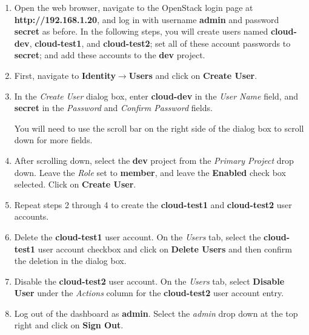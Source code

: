 \documentclass[letterpaper, 12pt]{article}
\begin{document}
\begin{enumerate}
    \item Open the web browser, navigate to the OpenStack login page at \textbf{http://192.168.1.20}, and log in with
    username \textbf{admin} and password \textbf{secret} as before. In the following steps, you will create users named
    \textbf{cloud-dev}, \textbf{cloud-test1}, and \textbf{cloud-test2}; set all of these account passwords to
    \textbf{secret}; and add these accounts to the \textbf{dev} project. 

    \item First, navigate to \textbf{Identity$\rightarrow$Users} and click on \textbf{Create User}.
    
    \item In the \textit{Create User} dialog box, enter \textbf{cloud-dev} in the \textit{User Name} field, and
    \textbf{secret} in the \textit{Password} and \textit{Confirm Password} fields.

    \begin{tipbox}{}
        You will need to use the scroll bar on the right side of the dialog box to scroll down for more fields.
    \end{tipbox}

    \item After scrolling down, select the \textbf{dev} project from the \textit{Primary Project} drop down. Leave the
    \textit{Role} set to \textbf{member}, and leave the \textbf{Enabled} check box selected. Click on
    \textbf{Create User}.

    \item Repeat steps 2 through 4 to create the \textbf{cloud-test1} and \textbf{cloud-test2} user accounts.
    
    \item Delete the \textbf{cloud-test1} user account. On the \textit{Users} tab, select the \textbf{cloud-test1} user
    account checkbox and click on \textbf{Delete Users} and then confirm the deletion in the dialog box.

    \item Disable the \textbf{cloud-test2} user account. On the \textit{Users} tab, select \textbf{Disable User} under
    the \textit{Actions} column for the \textbf{cloud-test2} user account entry.

    \item Log out of the dashboard as \textbf{admin}. Select the \textit{admin} drop down at the top right and click on
    \textbf{Sign Out}.


\end{enumerate}
\end{document}
